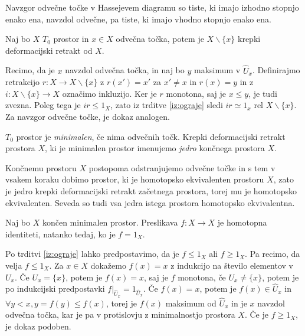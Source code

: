 \documentclass[mat1]{fmfdelo}
\begin{document}
Navzgor odvečne točke v Hassejevem diagramu so tiste, ki imajo 
izhodno stopnjo enako ena, navzdol odvečne, pa tiste, ki imajo vhodno stopnjo enako ena.
\begin{trditev}
Naj bo $X$ $T_0$ prostor in $x\in X$ odvečna točka, potem je $X\backslash \{x\}$ krepki deformacijski retrakt od $X$.
\end{trditev}

\begin{dokaz}
Recimo, da je $x$ navzdol odvečna točka, in naj bo $y$ 
maksimum v $\widehat{U}_x$. Definirajmo retrakcijo $r\colon X\rightarrow 
X\backslash \{x\}$ z $r(x')=x'$ za $x'\neq x$ in $r(x)=y$ in z $i\colon X\backslash\{x\} 
\rightarrow X$ označimo inkluzijo. Ker je $r$ monotona, saj je $x\leq y$, je tudi zvezna. Poleg tega je $ir\leq 1_X$, zato iz trditve \ref{iz:ograje} sledi $ir \simeq 1_x$ rel 
$X\backslash\{x\}$. Za navzgor odvečne točke, je 
dokaz analogen.
\end{dokaz}

\begin{definicija}
    $T_0$ prostor je \textit{minimalen}, če nima odvečnih točk. Krepki deformacijski retrakt prostora $X$, ki je minimalen prostor imenujemo \textit{jedro} končnega prostora $X$.
\end{definicija}

Končnemu prostoru $X$ postopoma odstranjujemo odvečne točke in s tem v vsakem koraku dobimo prostor, ki je homotopsko ekvivalenten prostoru $X$, zato je jedro krepki deformacijski retrakt začetnega prostora, torej mu je homotopsko ekvivalenten. Seveda so tudi vsa jedra istega prostora homotopsko ekvivalentna.

\begin{izrek}
    Naj bo $X$ končen minimalen prostor. Preslikava $f\colon X\rightarrow X$ je homotopna identiteti, natanko tedaj, ko je $f=1_X$.
    \label{iz:identiteta}
\end{izrek}

\begin{dokaz}
    Po trditvi \ref{iz:ograje} lahko predpostavimo, da je
    $f\leq 1_X$ ali $f\geq 1_X$. %
    Pa recimo, da velja $f\leq 1_X$. 
    Za $x\in X$ dokažemo $f(x)=x$ z indukcijo na 
    število elementov v $U_x$. Če $U_x=\{x\}$, potem je 
    $f(x)=x$, saj je $f$ monotona, če $U_x\neq\{x\}$, potem 
    je po indukcijski predpostavki 
    $f|_{\widehat{U}_x}=1_{\widehat{U}_x}$. Če $f(x)=x$, potem je 
    $f(x)\in \widehat{U}_x$ in $\forall y < x, y=f(y)\leq 
    f(x)$, torej je $f(x)$ maksimum od $\widehat{U}_x$ in je 
    $x$ navzdol odvečna točka, kar je pa v protislovju 
    z minimalnostjo prostora $X$. Če je $f\geq 1_X$, je 
    dokaz podoben.
\end{dokaz}
\end{document}
